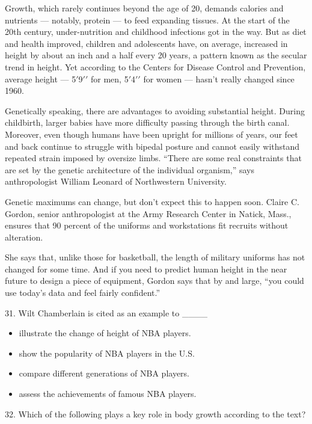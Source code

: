 \documentclass[UTF8,11pt]{ctexart}
\begin{document}
Growth, which rarely continues beyond the age of 20, demands calories and nutrients — notably, protein — to feed expanding tissues. At the start of the 20th century, under-nutrition and childhood infections got in the way. But as diet and health improved, children and adolescents have, on average, increased in height by about an inch and a half every 20 years, a pattern known as the secular trend in height. Yet according to the Centers for Disease Control and Prevention, average height — 5\(\prime\)9\(\prime\prime\) for men, 5\(\prime\)4\(\prime\prime\) for women — hasn’t really changed since 1960.


Genetically speaking, there are advantages to avoiding substantial height. During childbirth, larger babies have more difficulty passing through the birth canal. Moreover, even though humans have been upright for millions of years, our feet and back continue to struggle with bipedal posture and cannot easily withstand repeated strain imposed by oversize limbs. “There are some real constraints that are set by the genetic architecture of the individual organism,” says anthropologist William Leonard of Northwestern University.


Genetic maximums can change, but don’t expect this to happen soon. Claire C. Gordon, senior anthropologist at the Army Research Center in Natick, Mass., ensures that 90 percent of the uniforms and workstations fit recruits without alteration.


She says that, unlike those for basketball, the length of military uniforms has not changed for some time. And if you need to predict human height in the near future to design a piece of equipment, Gordon says that by and large, “you could use today’s data and feel fairly confident.”


31. Wilt Chamberlain is cited as an example to \_\_\_\_


\begin{itemize}[leftmargin=2em,itemsep=.2em,topsep=.4em]\item[A.] illustrate the change of height of NBA players.
\item[B.] show the popularity of NBA players in the U.S.
\item[C.] compare different generations of NBA players.
\item[D.] assess the achievements of famous NBA players.
\end{itemize}

32. Which of the following plays a key role in body growth according to the text?
\end{document}
